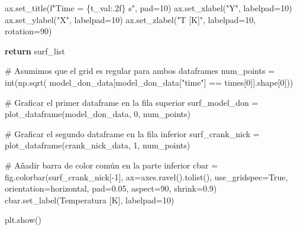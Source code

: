 \documentclass[
  spanish,
  us-letterpaper,
  DIV=11,
  numbers=noendperiod]{scrreprt}
\newenvironment{Shaded}{\begin{snugshade}}{\end{snugshade}}
\newcommand{\BuiltInTok}[1]{\textcolor[rgb]{0.00,0.23,0.31}{#1}}
\newcommand{\CommentTok}[1]{\textcolor[rgb]{0.37,0.37,0.37}{#1}}
\newcommand{\ControlFlowTok}[1]{\textcolor[rgb]{0.00,0.23,0.31}{\textbf{#1}}}
\newcommand{\DecValTok}[1]{\textcolor[rgb]{0.68,0.00,0.00}{#1}}
\newcommand{\FloatTok}[1]{\textcolor[rgb]{0.68,0.00,0.00}{#1}}
\newcommand{\NormalTok}[1]{\textcolor[rgb]{0.00,0.23,0.31}{#1}}
\newcommand{\OperatorTok}[1]{\textcolor[rgb]{0.37,0.37,0.37}{#1}}
\newcommand{\SpecialCharTok}[1]{\textcolor[rgb]{0.37,0.37,0.37}{#1}}
\newcommand{\SpecialStringTok}[1]{\textcolor[rgb]{0.13,0.47,0.30}{#1}}
\newcommand{\StringTok}[1]{\textcolor[rgb]{0.13,0.47,0.30}{#1}}
\newcommand{\VariableTok}[1]{\textcolor[rgb]{0.07,0.07,0.07}{#1}}
\theoremstyle{plain}
\theoremstyle{definition}
\theoremstyle{remark}
\begin{document}
\begin{Shaded}
\begin{Highlighting}[]
\NormalTok{        ax.set\_title(}\SpecialStringTok{f"Time = }\SpecialCharTok{\{}\NormalTok{t\_val}\SpecialCharTok{:.2f\}}\SpecialStringTok{ s"}\NormalTok{, pad}\OperatorTok{=}\DecValTok{10}\NormalTok{)}
\NormalTok{        ax.set\_xlabel(}\StringTok{"Y"}\NormalTok{, labelpad}\OperatorTok{=}\DecValTok{10}\NormalTok{)}
\NormalTok{        ax.set\_ylabel(}\StringTok{"X"}\NormalTok{, labelpad}\OperatorTok{=}\DecValTok{10}\NormalTok{)}
\NormalTok{        ax.set\_zlabel(}\StringTok{"T [K]"}\NormalTok{, labelpad}\OperatorTok{=}\DecValTok{10}\NormalTok{, rotation}\OperatorTok{=}\DecValTok{90}\NormalTok{)}
    
    \ControlFlowTok{return}\NormalTok{ surf\_list}

\CommentTok{\# Asumimos que el grid es regular para ambos dataframes}
\NormalTok{num\_points }\OperatorTok{=} \BuiltInTok{int}\NormalTok{(np.sqrt(}
\NormalTok{        model\_don\_data[model\_don\_data[}\StringTok{"time"}\NormalTok{] }\OperatorTok{==}\NormalTok{ times[}\DecValTok{0}\NormalTok{]].shape[}\DecValTok{0}\NormalTok{]))}

\CommentTok{\# Graficar el primer dataframe en la fila superior}
\NormalTok{surf\_model\_don }\OperatorTok{=}\NormalTok{ plot\_dataframe(model\_don\_data, }\DecValTok{0}\NormalTok{, num\_points)}

\CommentTok{\# Graficar el segundo dataframe en la fila inferior}
\NormalTok{surf\_crank\_nick }\OperatorTok{=}\NormalTok{ plot\_dataframe(crank\_nick\_data, }\DecValTok{1}\NormalTok{, num\_points)}

\CommentTok{\# Añadir barra de color común en la parte inferior}
\NormalTok{cbar }\OperatorTok{=}\NormalTok{ fig.colorbar(surf\_crank\_nick[}\OperatorTok{{-}}\DecValTok{1}\NormalTok{], ax}\OperatorTok{=}\NormalTok{axes.ravel().tolist(),}
\NormalTok{                    use\_gridspec}\OperatorTok{=}\VariableTok{True}\NormalTok{, orientation}\OperatorTok{=}\StringTok{\textquotesingle{}horizontal\textquotesingle{}}\NormalTok{,}
\NormalTok{                    pad}\OperatorTok{=}\FloatTok{0.05}\NormalTok{, aspect}\OperatorTok{=}\DecValTok{90}\NormalTok{, shrink}\OperatorTok{=}\FloatTok{0.9}\NormalTok{)}
\NormalTok{cbar.set\_label(}\StringTok{\textquotesingle{}Temperatura [K]\textquotesingle{}}\NormalTok{, labelpad}\OperatorTok{=}\DecValTok{10}\NormalTok{)}


\NormalTok{plt.show()}
\end{Highlighting}
\end{Shaded}
\end{document}
